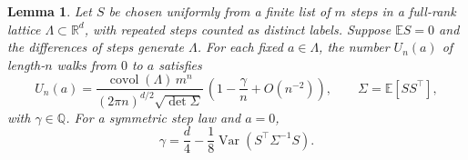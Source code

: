 \documentclass[11pt,reqno,a4paper]{amsart}
\newtheorem{lemma}[theorem]{Lemma}
\theoremstyle{remark}
\begin{document}
\begin{lemma}\label{lem:app-walk-expansion}
Let \(S\) be chosen uniformly from a finite list of \(m\) steps in a
full-rank lattice \(\Lambda\subset\mathbb R^d\), with repeated steps
counted as distinct labels. Suppose \(\mathbb E S=0\) and the
differences of steps generate \(\Lambda\). For each fixed
\(a\in\Lambda\), the number \(U_n(a)\) of length-\(n\) walks from
\(0\) to \(a\) satisfies
\[
 U_n(a)=
 \frac{\operatorname{covol}(\Lambda)\,m^n}
      {(2\pi n)^{d/2}\sqrt{\det\Sigma}}\,
 \left(1-\frac{\gamma}{n}+O(n^{-2})\right),
 \qquad \Sigma=\mathbb E[SS^\top],
\]
with \(\gamma\in\mathbb Q\). For a symmetric step law and \(a=0\),
\begin{equation}\label{eq:app-symmetric-correction}
 \gamma=\frac d4-\frac18\operatorname{Var}(S^\top\Sigma^{-1}S).
\end{equation}
\end{lemma}
\end{document}
